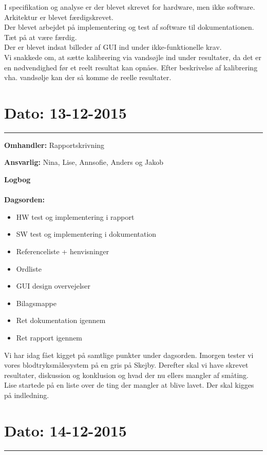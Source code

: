 I specifikation og analyse er der blevet skrevet for hardware, men ikke software.\\
Arkitektur er blevet færdigskrevet. \\
Der blevet arbejdet på implementering og test af software til dokumentationen. Tæt på at være færdig.\\
Der er blevet indsat billeder af GUI ind under ikke-funktionelle krav.\\
Vi snakkede om, at sætte kalibrering via vandsøjle ind under resultater, da det er en nødvendighed før et reelt resultat kan opnåes. Efter beskrivelse af kalibrering vha. vandsølje kan der så komme de reelle resultater.

	
	
	
\section{Dato: 13-12-2015 }
\hrule

\textbf{Omhandler:} Rapportskrivning

\textbf{Ansvarlig:} Nina, Lise, Annsofie, Anders og Jakob

\textbf{Logbog}
\\
\\
\textbf{Dagsorden:}
\begin{itemize}
	\item HW test og implementering i rapport
	\item SW test og implementering i dokumentation
	\item Referenceliste + henvisninger
	\item Ordliste
	\item GUI design overvejelser
	\item Bilagsmappe
	\item Ret dokumentation igennem
	\item Ret rapport igennem
\end{itemize}

Vi har idag fået kigget på samtlige punkter under dagsorden.
Imorgen tester vi vores blodtryksmålesystem på en gris på Skejby.
Derefter skal vi have skrevet resultater, diskussion og konklusion og hvad der nu ellers mangler af småting. 
Lise startede på en liste over de ting der mangler at blive lavet. 
Der skal kigges på indledning.
	
	
\section{Dato: 14-12-2015 }
\hrule

